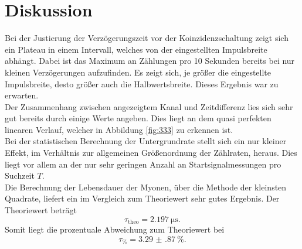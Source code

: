\section{Diskussion}

Bei der Justierung der Verzögerungszeit vor der Koinzidenzschaltung zeigt sich ein Plateau in einem Intervall, welches von der eingestellten Impulsbreite
abhängt. Dabei ist das Maximum an Zählungen pro 10 Sekunden bereits bei nur kleinen Verzögerungen aufzufinden. Es zeigt sich, je größer die eingestellte Impulsbreite,
desto größer auch die Halbwertsbreite. Dieses Ergebnis war zu erwarten. 
\\
\newline
Der Zusammenhang zwischen angezeigtem Kanal und Zeitdifferenz lies sich sehr gut bereits durch einige Werte angeben. Dies liegt an dem quasi perfekten linearen Verlauf, welcher
in Abbildung \ref{fig:333} zu erkennen ist.
\\
\newline
Bei der statistischen Berechnung der Untergrundrate stellt sich ein nur kleiner Effekt, im Verhältnis zur allgemeinen Größenordnung der Zählraten, heraus. Dies liegt vor allem an der nur sehr geringen Anzahl
an Startsignalmessungen pro Suchzeit $T$. 
\\
\newline
Die Berechnung der Lebensdauer der Myonen, über die Methode der kleinsten Quadrate, liefert ein im Vergleich zum Theoriewert sehr gutes Ergebnis. Der Theoriewert
\cite{myontime} beträgt
\begin{equation}
\tau_{\text{theo}} = \SI{2.197}{\micro\second}.
\end{equation}
Somit liegt die prozentuale Abweichung zum Theoriewert bei 
\begin{equation}
\tau_{\si{\percent}} = \SI{3.29(87)}{\percent}.
\end{equation}